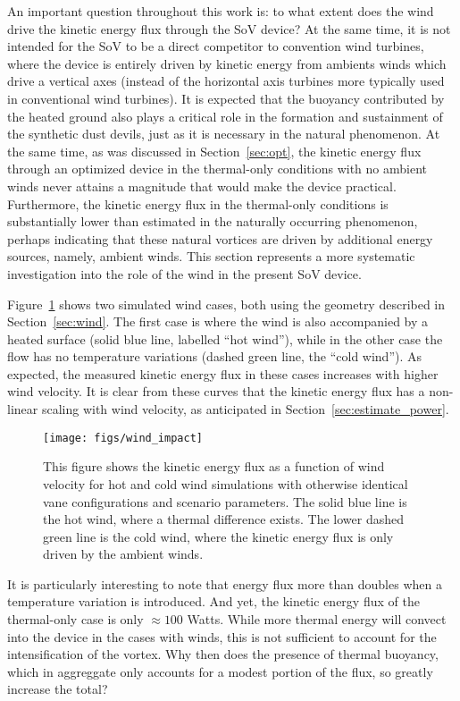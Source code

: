 An important question throughout this work is: to what extent does the wind
drive the kinetic energy flux through the SoV device? At the same time, 
it is not intended for the SoV to be a direct competitor to convention wind turbines,
where the device is entirely driven by kinetic energy from ambients winds which drive 
a vertical axes (instead of the horizontal axis turbines more typically 
used in conventional wind turbines). It is expected that the buoyancy contributed
by the heated ground also plays a critical role in the formation and sustainment of 
the synthetic dust devils, just as it is necessary in the natural phenomenon. 
At the same time, as was discussed in Section~\ref{sec:opt}, 
the kinetic energy flux through an optimized device in the thermal-only conditions 
with no ambient winds
never attains a magnitude that would make the device practical. 
Furthermore, the kinetic energy flux in the thermal-only conditions 
is substantially lower than estimated in the naturally occurring phenomenon, 
perhaps indicating that these natural vortices are driven by additional energy 
sources, namely, ambient winds.
This section represents a more systematic investigation into the role of the wind 
in the present SoV device. 

Figure~\ref{fig:wind_impact} shows two simulated wind cases, both using
 the geometry described in Section~\ref{sec:wind}. 
The first case is where the wind is also accompanied by a heated surface 
(solid blue line, labelled ``hot wind''),  
while in the other case the flow has no temperature variations (dashed
 green line, the ``cold wind''). As expected, the measured kinetic
 energy flux in these cases increases with higher wind velocity. It is
 clear from these curves that the kinetic energy flux has a non-linear
 scaling with wind velocity, as anticipated in
 Section~\ref{sec:estimate_power}.  

\begin{figure}[htb!]
\centering
 \texttt{[image: figs/wind\_impact]}
 \caption{This figure shows the kinetic energy flux as a function of
 wind velocity for hot and cold wind simulations with otherwise
 identical vane configurations and scenario parameters. The solid blue
 line is the hot wind, where a thermal difference exists. The lower
 dashed green line is the cold wind, where the kinetic energy flux is
 only driven by the ambient winds. }  
 \label{fig:wind_impact}  
\end{figure}

It is particularly interesting to note that energy flux more than
doubles when a temperature variation is introduced. And yet, the kinetic
energy flux of the thermal-only case is  only $\approx 100$ Watts.  
While more thermal energy will convect into the device in the cases with
winds, this is not sufficient to account for the intensification of the
vortex. Why then does the presence of thermal buoyancy, which in
aggreggate only accounts for a modest portion of the flux, so greatly
increase the total? 

